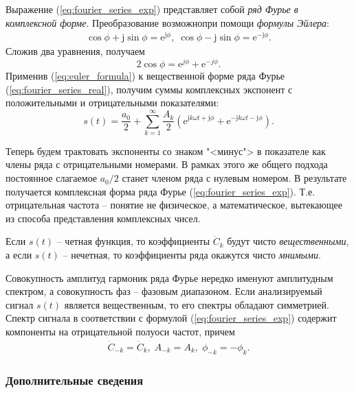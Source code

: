 \documentclass[12pt,a4paper]{article}
\begin{document}
Выражение (\ref{eq:fourier_series_exp}) представляет собой \emph{ряд Фурье в комплексной форме}. Преобразование возможнопри помощи \emph{формулы Эйлера}:
\begin{eqnarray}
\nonumber
{\cos\phi +\mathrm{j}\sin\phi =\mathrm{e}^{\mathrm{j}\phi},}\;
\nonumber
{\cos\phi -\mathrm{j}\sin\phi =\mathrm{e}^{-\mathrm{j}\phi}.}
\end{eqnarray}
Сложив два уравнения, получаем
\begin{equation}
\label{eq:euler_formula}
2\cos\phi =\mathrm{e}^{j\phi}+\mathrm{e}^{-j\phi}.
\end{equation}
Применив (\ref{eq:euler_formula}) к вещественной форме ряда Фурье (\ref{eq:fourier_series_real}), получим суммы комплексных экспонент с положительными и отрицательными показателями:
\begin{equation}
\nonumber
s\left( t\right)=\frac{a_0}{2}+\sum_{k=1}^{\infty}{\frac{A_k}{2}\left(\mathrm{e}^{\mathrm{j}k\omega t +\mathrm{j}\phi}+\mathrm{e}^{-\mathrm{j}k\omega t -\mathrm{j}\phi}\right)}.
\end{equation}

Теперь будем трактовать экспоненты со знаком "<минус"> в показателе как члены ряда с отрицательными номерами. В рамках этого же общего подхода постоянное слагаемое $a_0/2$ станет  членом ряда с нулевым номером. В результате получается комплексная форма ряда Фурье (\ref{eq:fourier_series_exp}). Т.е. отрицательная частота -- понятие не физическое, а математическое, вытекающее из способа представления комплексных чисел.

Если $s\left(t\right)$ -- четная функция, то коэффициенты $\dot{C}_k$ будут чисто \emph{вещественными}, а если $s\left(t\right)$ -- нечетная, то коэффициенты ряда окажутся чисто \emph{мнимыми}.

Совокупность амплитуд гармоник ряда Фурье нередко именуют амплитудным спектром, а совокупность фаз -- фазовым диапазоном. Если анализируемый сигнал $s\left(t\right)$ является вещественным, то его спектры обладают симметрией. Спектр сигнала в соответствии с формулой (\ref{eq:fourier_series_exp}) содержит компоненты на отрицательной полуоси частот, причем
\begin{eqnarray}
\nonumber
{\dot{C}_{-k}=\dot{C}_k ,}\;
{A_{-k}=A_k,}\;
{\phi_{-k}=-\phi_k.}
\end{eqnarray}

\subsubsection{Дополнительные сведения}
\end{document}
